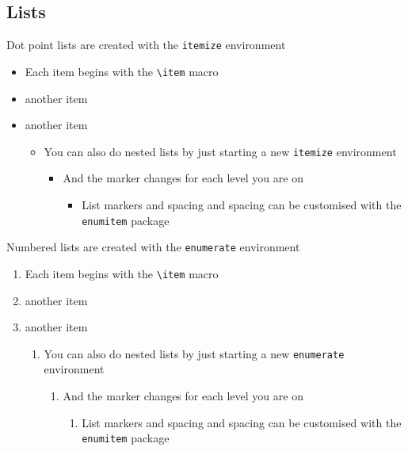 \documentclass{article}
\begin{document}


\subsection{Lists}

Dot point lists are created with the \lstinline{itemize} environment
\begin{itemize}
  \item Each item begins with the \lstinline{\item} macro
  \item another item
  \item another item
    \begin{itemize}
      \item You can also do nested lists by just starting a new \lstinline{itemize} environment
        \begin{itemize}
          \item And the marker changes for each level you are on
            \begin{itemize}
              \item List markers and spacing and spacing can be customised with the \lstinline{enumitem} package
            \end{itemize}
        \end{itemize}
    \end{itemize}
\end{itemize}


Numbered lists are created with the \lstinline{enumerate} environment
\begin{enumerate}
  \item Each item begins with the \lstinline{\item} macro
  \item another item
  \item another item
    \begin{enumerate}
      \item You can also do nested lists by just starting a new \lstinline{enumerate} environment
        \begin{enumerate}
          \item And the marker changes for each level you are on
            \begin{enumerate}
              \item List markers and spacing and spacing can be customised with the \lstinline{enumitem} package
            \end{enumerate}
        \end{enumerate}
    \end{enumerate}
\end{enumerate}
\end{document}
